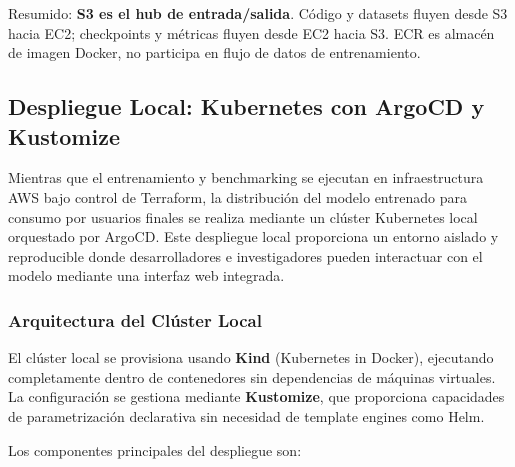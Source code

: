 Resumido: \textbf{S3 es el hub de entrada/salida}. Código y datasets fluyen desde S3 hacia EC2; checkpoints y métricas fluyen desde EC2 hacia S3. ECR es almacén de imagen Docker, no participa en flujo de datos de entrenamiento.

\subsection{Despliegue Local: Kubernetes con ArgoCD y Kustomize}

Mientras que el entrenamiento y benchmarking se ejecutan en infraestructura AWS bajo control de Terraform, la distribución del modelo entrenado para consumo por usuarios finales se realiza mediante un clúster Kubernetes local orquestado por ArgoCD. Este despliegue local proporciona un entorno aislado y reproducible donde desarrolladores e investigadores pueden interactuar con el modelo mediante una interfaz web integrada.

\subsubsection{Arquitectura del Clúster Local}

El clúster local se provisiona usando \textbf{Kind} (Kubernetes in Docker), ejecutando completamente dentro de contenedores sin dependencias de máquinas virtuales. La configuración se gestiona mediante \textbf{Kustomize}, que proporciona capacidades de parametrización declarativa sin necesidad de template engines como Helm.

Los componentes principales del despliegue son:

